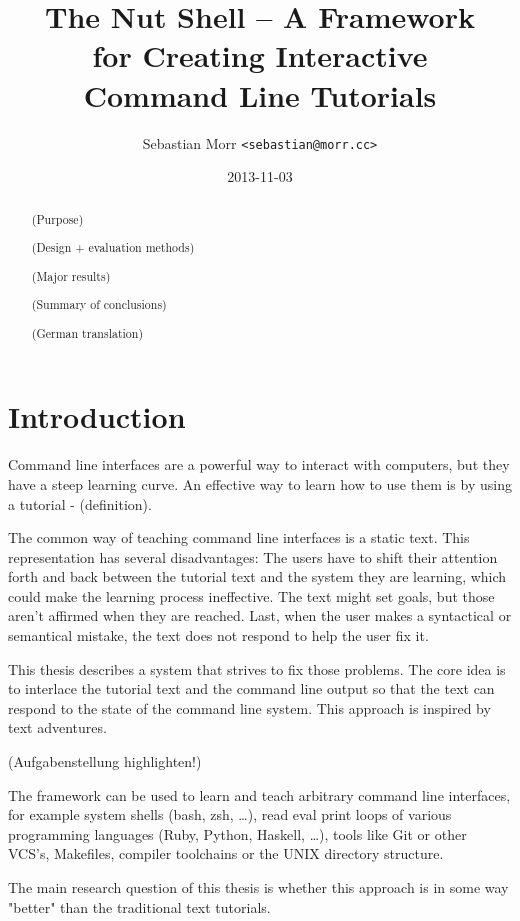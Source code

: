 \documentclass[twoside]{scrreprt}
\title{The Nut Shell -- A Framework \\ for Creating Interactive \\ Command Line Tutorials}
\author{Sebastian Morr \texttt{<sebastian@morr.cc>}}
\date{2013-11-03}
\begin{document}
\maketitle

\begin{abstract}
(Purpose)

(Design + evaluation methods)

(Major results)

(Summary of conclusions)

\vspace{8em}

(German translation)
\end{abstract}

\setcounter{tocdepth}{1}
\tableofcontents

\chapter{Introduction}

Command line interfaces are a powerful way to interact with computers, but they have a steep learning curve. An effective way to learn how to use them is by using a tutorial - (definition).

The common way of teaching command line interfaces is a static text. This representation has several disadvantages: The users have to shift their attention forth and back between the tutorial text and the system they are learning, which could make the learning process ineffective. The text might set goals, but those aren't affirmed when they are reached. Last, when the user makes a syntactical or semantical mistake, the text does not respond to help the user fix it.

This thesis describes a system that strives to fix those problems. The core idea is to interlace the tutorial text and the command line output so that the text can respond to the state of the command line system. This approach is inspired by text adventures.

(Aufgabenstellung highlighten!)

The framework can be used to learn and teach arbitrary command line interfaces, for example system shells (bash, zsh, …), read eval print loops of various programming languages (Ruby, Python, Haskell, …), tools like Git or other VCS's, Makefiles, compiler toolchains or the UNIX directory structure.

The main research question of this thesis is whether this approach is in some way "better" than the traditional text tutorials.
\end{document}
